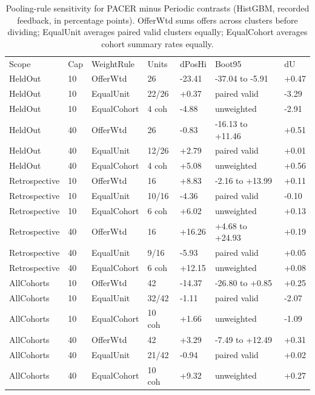 \begin{table}[!ht]
\centering\footnotesize\setlength{\tabcolsep}{3.5pt}
\caption{Pooling-rule sensitivity for PACER minus Periodic contrasts (HistGBM, recorded feedback, in percentage points). OfferWtd sums offers across clusters before dividing; EqualUnit averages paired valid clusters equally; EqualCohort averages cohort summary rates equally.}
\begin{tabular}{lllllll}
\hline
Scope & Cap & WeightRule & Units & dPosHi & Boot95 & dU \\
HeldOut & 10 & OfferWtd & 26 & -23.41 & -37.04 to -5.91 & +0.47 \\
HeldOut & 10 & EqualUnit & 22/26 & +0.37 & paired valid & -3.29 \\
HeldOut & 10 & EqualCohort & 4 coh & -4.88 & unweighted & -2.91 \\
HeldOut & 40 & OfferWtd & 26 & -0.83 & -16.13 to +11.46 & +0.51 \\
HeldOut & 40 & EqualUnit & 12/26 & +2.79 & paired valid & +0.01 \\
HeldOut & 40 & EqualCohort & 4 coh & +5.08 & unweighted & +0.56 \\
Retrospective & 10 & OfferWtd & 16 & +8.83 & -2.16 to +13.99 & +0.11 \\
Retrospective & 10 & EqualUnit & 10/16 & -4.36 & paired valid & -0.10 \\
Retrospective & 10 & EqualCohort & 6 coh & +6.02 & unweighted & +0.13 \\
Retrospective & 40 & OfferWtd & 16 & +16.26 & +4.68 to +24.93 & +0.19 \\
Retrospective & 40 & EqualUnit & 9/16 & -5.93 & paired valid & +0.05 \\
Retrospective & 40 & EqualCohort & 6 coh & +12.15 & unweighted & +0.08 \\
AllCohorts & 10 & OfferWtd & 42 & -14.37 & -26.80 to +0.85 & +0.25 \\
AllCohorts & 10 & EqualUnit & 32/42 & -1.11 & paired valid & -2.07 \\
AllCohorts & 10 & EqualCohort & 10 coh & +1.66 & unweighted & -1.09 \\
AllCohorts & 40 & OfferWtd & 42 & +3.29 & -7.49 to +12.49 & +0.31 \\
AllCohorts & 40 & EqualUnit & 21/42 & -0.94 & paired valid & +0.02 \\
AllCohorts & 40 & EqualCohort & 10 coh & +9.32 & unweighted & +0.27 \\
\hline
\end{tabular}
\end{table}
